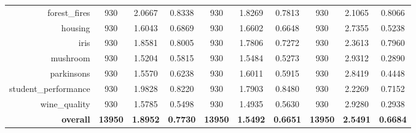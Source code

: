 \begin{table}[htbp]
{\begin{tabular}{rccccccccc}
			forest\_fires                       & 930                                & 2.0667                                                                    & 0.8338          & 930            & \cellcolor[rgb]{ .776,  .937,  .808}\textcolor[rgb]{ 0,  .38,  0}{1.8269}          & 0.7813          & 930            & 2.1065          & 0.8066          \\
			housing                             & 930                                & \cellcolor[rgb]{ .776,  .937,  .808}\textcolor[rgb]{ 0,  .38,  0}{1.6043} & 0.6869          & 930            & 1.6602                                                                             & 0.6648          & 930            & 2.7355          & 0.5238          \\
			iris                                & 930                                & 1.8581                                                                    & 0.8005          & 930            & \cellcolor[rgb]{ .776,  .937,  .808}\textcolor[rgb]{ 0,  .38,  0}{1.7806}          & 0.7272          & 930            & 2.3613          & 0.7960          \\
			mushroom                            & 930                                & \cellcolor[rgb]{ .776,  .937,  .808}\textcolor[rgb]{ 0,  .38,  0}{1.5204} & 0.5815          & 930            & 1.5484                                                                             & 0.5273          & 930            & 2.9312          & 0.2890          \\
			parkinsons                          & 930                                & \cellcolor[rgb]{ .776,  .937,  .808}\textcolor[rgb]{ 0,  .38,  0}{1.5570} & 0.6238          & 930            & 1.6011                                                                             & 0.5915          & 930            & 2.8419          & 0.4448          \\
			student\_performance                & 930                                & 1.9828                                                                    & 0.8220          & 930            & \cellcolor[rgb]{ .776,  .937,  .808}\textcolor[rgb]{ 0,  .38,  0}{1.7903}          & 0.8480          & 930            & 2.2269          & 0.7152          \\
			wine\_quality                       & 930                                & 1.5785                                                                    & 0.5498          & 930            & \cellcolor[rgb]{ .776,  .937,  .808}\textcolor[rgb]{ 0,  .38,  0}{1.4935}          & 0.5630          & 930            & 2.9280          & 0.2938          \\
			\midrule
			\textbf{overall}                    & \textbf{13950}                     & \textbf{1.8952}                                                           & \textbf{0.7730} & \textbf{13950} & \cellcolor[rgb]{ .776,  .937,  .808}\textcolor[rgb]{ 0,  .38,  0}{\textbf{1.5492}} & \textbf{0.6651} & \textbf{13950} & \textbf{2.5491} & \textbf{0.6684} \\
		\end{tabular}%
	}
\end{table}%


